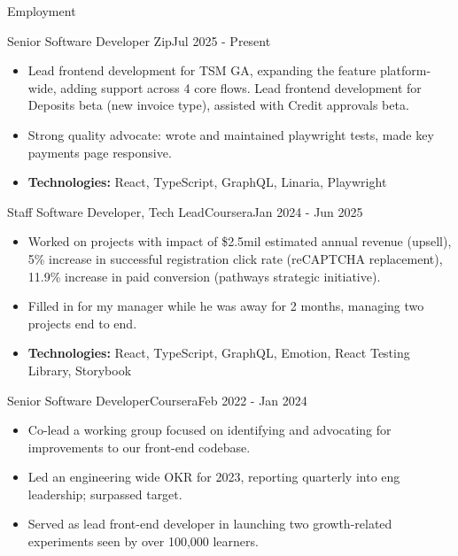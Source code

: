 \documentclass[]{mcdowellcv}
\begin{document}
	\begin{cvsection}{Employment}
	        \begin{cvsubsection}{Senior Software Developer}
{Zip}{Jul 2025 - Present}
					\begin{itemize}
						\item Lead frontend development for TSM GA, expanding the feature platform-wide, adding support across 4 core flows. Lead frontend development for Deposits beta (new invoice type), assisted with Credit approvals beta.
						\item Strong quality advocate: wrote and maintained playwright tests, made key payments page responsive.
						\item \textbf{Technologies:} React, TypeScript, GraphQL, Linaria, Playwright
					\end{itemize}
           \end{cvsubsection}        
		    \begin{cvsubsection}{Staff Software Developer, Tech Lead}{Coursera}{Jan 2024 - Jun 2025}
	                \begin{itemize}
	                        \item Worked on projects with impact of \$2.5mil estimated annual revenue (upsell), 5\% increase in successful registration click rate (reCAPTCHA replacement), 11.9\% increase in paid conversion (pathways strategic initiative).
	                        \item Filled in for my manager while he was away for 2 months, managing two projects end to end.
	                        \item \textbf{Technologies:} React, TypeScript, GraphQL, Emotion, React Testing Library, Storybook
	                \end{itemize}
	           
	        \end{cvsubsection}
	        \begin{cvsubsection}{Senior Software Developer}{Coursera}{Feb 2022 - Jan 2024}
	                \begin{itemize}
	                        \item Co-lead a working group focused on identifying and advocating for improvements to our front-end codebase.
	                        \item Led an engineering wide OKR for 2023, reporting quarterly into eng leadership; surpassed target.
	                        \item Served as lead front-end developer in launching two growth-related experiments seen by over 100,000 learners.
	                \end{itemize}
	           

\end{cvsubsection}
\end{cvsection}
\end{document}
